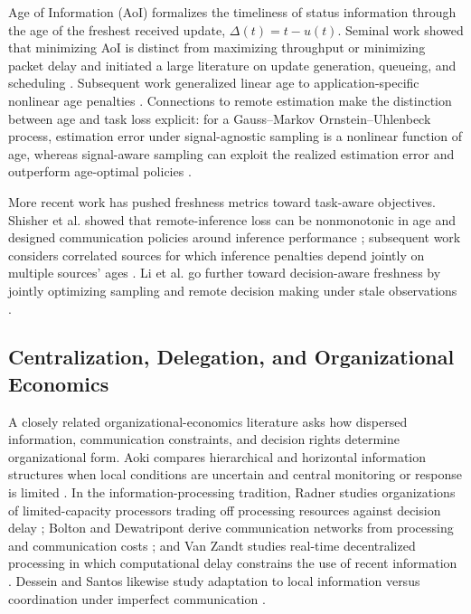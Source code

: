 \documentclass[11pt]{article}
\begin{document}
Age of Information (AoI) formalizes the timeliness of status information through the age of the freshest received update, $\Delta(t)=t-u(t)$. Seminal work showed that minimizing AoI is distinct from maximizing throughput or minimizing packet delay and initiated a large literature on update generation, queueing, and scheduling \cite{kaul2012realtime,yates2021aoi}. Subsequent work generalized linear age to application-specific nonlinear age penalties \cite{sun2017update}. Connections to remote estimation make the distinction between age and task loss explicit: for a Gauss--Markov Ornstein--Uhlenbeck process, estimation error under signal-agnostic sampling is a nonlinear function of age, whereas signal-aware sampling can exploit the realized estimation error and outperform age-optimal policies \cite{ornee2021ou}.

More recent work has pushed freshness metrics toward task-aware objectives. Shisher et al. showed that remote-inference loss can be nonmonotonic in age and designed communication policies around inference performance \cite{shisher2024timely}; subsequent work considers correlated sources for which inference penalties depend jointly on multiple sources' ages \cite{shisher2026correlated}. Li et al. go further toward decision-aware freshness by jointly optimizing sampling and remote decision making under stale observations \cite{li2026freshness}.

\subsection{Centralization, Delegation, and Organizational Economics}

A closely related organizational-economics literature asks how dispersed information, communication constraints, and decision rights determine organizational form. Aoki compares hierarchical and horizontal information structures when local conditions are uncertain and central monitoring or response is limited \cite{aoki1986horizontal}. In the information-processing tradition, Radner studies organizations of limited-capacity processors trading off processing resources against decision delay \cite{radner1993organization}; Bolton and Dewatripont derive communication networks from processing and communication costs \cite{bolton1994firm}; and Van Zandt studies real-time decentralized processing in which computational delay constrains the use of recent information \cite{vanzandt1999realtime}. Dessein and Santos likewise study adaptation to local information versus coordination under imperfect communication \cite{dessein2006adaptive}.
\end{document}
